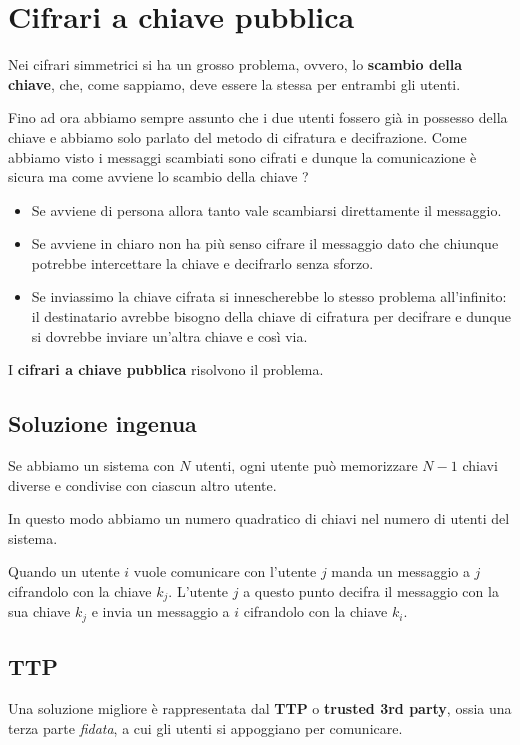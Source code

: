 \chapter{Cifrari a chiave pubblica}
Nei cifrari simmetrici si ha un grosso problema, ovvero, lo \textbf{scambio della chiave}, che, come sappiamo, deve
essere la stessa per entrambi gli utenti.

Fino ad ora abbiamo sempre assunto che i due utenti fossero gi\`a in possesso della chiave e abbiamo solo parlato del
metodo di cifratura e decifrazione. Come abbiamo visto i messaggi scambiati sono cifrati e dunque la comunicazione \`e
sicura ma come avviene lo scambio della chiave ?
\begin{itemize}
	\item Se avviene di persona allora tanto vale scambiarsi direttamente il messaggio.
	\item Se avviene in chiaro non ha pi\`u senso cifrare il messaggio dato che chiunque potrebbe intercettare la
	      chiave e decifrarlo senza sforzo.
	\item Se inviassimo la chiave cifrata si innescherebbe lo stesso problema all'infinito: il destinatario avrebbe
	      bisogno della chiave di cifratura per decifrare e dunque si dovrebbe inviare un'altra chiave e cos\`i via.
\end{itemize}
I \textbf{cifrari a chiave pubblica} risolvono il problema.

\section{Soluzione ingenua}
Se abbiamo un sistema con $N$ utenti, ogni utente pu\`o memorizzare $N-1$ chiavi diverse e condivise con ciascun altro
utente.

In questo modo abbiamo un numero quadratico di chiavi nel numero di utenti del sistema.

Quando un utente $i$ vuole comunicare con l'utente $j$ manda un messaggio a $j$ cifrandolo con la chiave $k_j$.
L'utente $j$ a questo punto decifra il messaggio con la sua chiave $k_j$ e invia un messaggio a $i$ cifrandolo con
la chiave $k_i$.

\section{TTP}
Una soluzione migliore \`e rappresentata dal \textbf{TTP} o \textbf{trusted 3rd party}, ossia una terza parte
\emph{fidata}, a cui gli utenti si appoggiano per comunicare.


